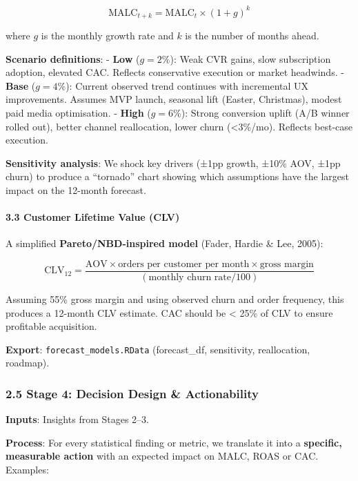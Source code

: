 \documentclass[
  11pt,
]{article}
\begin{document}
\[\text{MALC}_{t+k} = \text{MALC}_t \times (1 + g)^k\]

where \(g\) is the monthly growth rate and \(k\) is the number of months
ahead.

\textbf{Scenario definitions}: - \textbf{Low} (\(g = 2\%\)): Weak CVR
gains, slow subscription adoption, elevated CAC. Reflects conservative
execution or market headwinds. - \textbf{Base} (\(g = 4\%\)): Current
observed trend continues with incremental UX improvements. Assumes MVP
launch, seasonal lift (Easter, Christmas), modest paid media
optimisation. - \textbf{High} (\(g = 6\%\)): Strong conversion uplift
(A/B winner rolled out), better channel reallocation, lower churn
(\textless3\%/mo). Reflects best-case execution.

\textbf{Sensitivity analysis}: We shock key drivers (±1pp growth, ±10\%
AOV, ±1pp churn) to produce a ``tornado'' chart showing which
assumptions have the largest impact on the 12-month forecast.

\paragraph{3.3 Customer Lifetime Value
(CLV)}\label{customer-lifetime-value-clv}

A simplified \textbf{Pareto/NBD-inspired model} (Fader, Hardie \& Lee,
2005):

\[\text{CLV}_{12} = \frac{\text{AOV} \times \text{orders per customer per month} \times \text{gross margin}}{(\text{monthly churn rate} / 100)}\]

Assuming 55\% gross margin and using observed churn and order frequency,
this produces a 12-month CLV estimate. CAC should be \textless{} 25\% of
CLV to ensure profitable acquisition.

\textbf{Export}: \texttt{forecast\_models.RData} (forecast\_df,
sensitivity, reallocation, roadmap).

\subsubsection{2.5 Stage 4: Decision Design \&
Actionability}\label{stage-4-decision-design-actionability}

\textbf{Inputs}: Insights from Stages 2--3.

\textbf{Process}: For every statistical finding or metric, we translate
it into a \textbf{specific, measurable action} with an expected impact
on MALC, ROAS or CAC. Examples:
\end{document}
